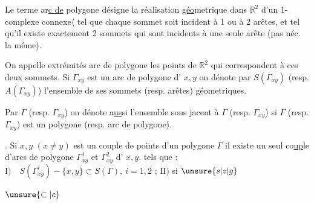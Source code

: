 \margin{$\cdot\quad\cdot$}Le terme ar\uline{c de} polygone désigne la réalisation \uline{géo}metrique dans $\mathbb{R}^{2}$ d'un 1-complexe connexe$\langle$ tel que chaque sommet soit incident à 1 ou à 2 arêtes, et tel qu'il existe exactement 2 sommets qui sont incidents à une seule arête (pas néc. la même).

On appelle extrémités  arc de polygone les points de $\mathbb{R}^{2}$ qui correspondent à ces deux sommets. Si $\Gamma_{xy}$ est un arc de polygone d' $x,y$ on dénote par $S(\Gamma_{xy})$ (resp. $A(\Gamma_{xy})$) l'ensemble de ses sommets (resp. arêtes) géometriques.

\margin{$\bullet$}Par $\Gamma$ (resp. $\Gamma_{xy}$) on dénote a\uline{us}si l'ensemble  sous jacent à $\Gamma$ (resp. $\Gamma_{xy}$) si $\Gamma$  (resp. $\Gamma_{xy}$) est un polygone (resp. arc de polygone).

. Si $x,y$ $(x\ne y)$ est un couple de points d'un polygone $\Gamma$ il existe \margin{$\cdot$}un seul co\uline{up}le d'arcs de polygone $\Gamma^{1}_{xy}$ et $\Gamma^{2}_{xy}$ d' $x,y$. tels que : $\mathrm{I})\quad S(\Gamma^{i}_{xy})-\{x,y\}\subset S(\Gamma),\ i=1,2$ ; $\mathrm{II})$ si $\unsure{s|z|g}$ 
\par\noindent$\unsure{\subset|c}$


